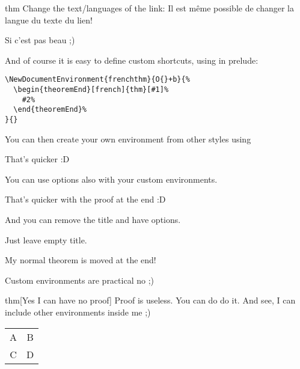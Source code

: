 \documentclass{article}
\begin{document}
\begin{theoremEnd}[french]{thm}%
  Change the text/languages of the link: Il est même possible de changer la langue du texte du lien!  
\end{theoremEnd}
\begin{proofEnd}
  Si c'est pas beau ;)
\end{proofEnd}

And of course it is easy to define custom shortcuts, using in prelude:
\begin{verbatim}
\NewDocumentEnvironment{frenchthm}{O{}+b}{%
  \begin{theoremEnd}[french]{thm}[#1]%
    #2%
  \end{theoremEnd}%
}{}
\end{verbatim}

\begin{mynormalthm}
  You can then create your own environment from other styles using
\end{mynormalthm}
\begin{proofEnd}
  That's quicker :D
\end{proofEnd}

\begin{mynormalthm}
  You can use options also with your custom environments.
\end{mynormalthm}
\begin{proofEnd}
  That's quicker with the proof at the end :D
\end{proofEnd}

\begin{mynormalthm}[][end]
  And you can remove the title and have options.
\end{mynormalthm}
\begin{proofEnd}
  Just leave empty title.
\end{proofEnd}

\begin{mynormalthm}
  My normal theorem is moved at the end!
\end{mynormalthm}
\begin{proofEnd}
  Custom environments are practical no ;)
\end{proofEnd}

\begin{theoremEnd}[]{thm}[Yes I can have no proof]
  Proof is useless. You can do do it. And see, I can include other environments inside me ;)\\
  \begin{tabular}{ c c } 
    A & B \\ 
    C & D \\ 
  \end{tabular}
\end{theoremEnd}
\end{document}
